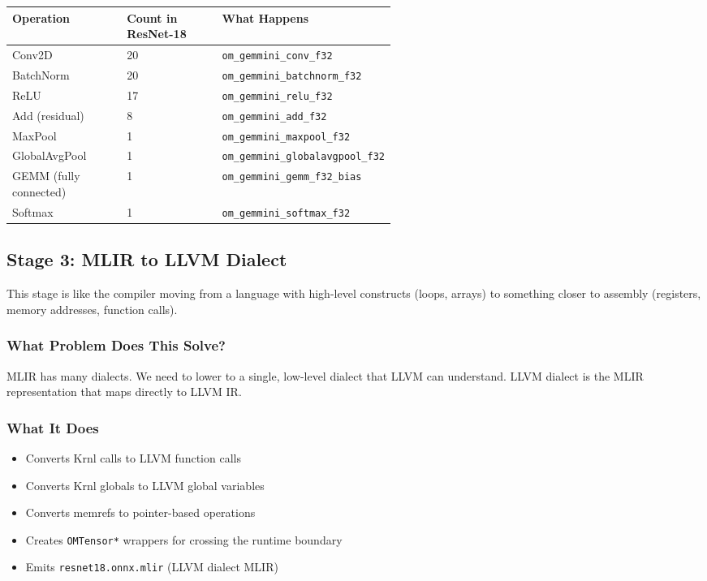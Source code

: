 \documentclass[12pt,a4paper]{article}
\begin{document}
\begin{table}[H]
\centering
\small
\begin{tabularx}{\linewidth}{@{}L{0.30\linewidth}L{0.25\linewidth}Y@{}}
\toprule
\textbf{Operation} & \textbf{Count in ResNet-18} & \textbf{What Happens} \\
\midrule
Conv2D & 20 & \texttt{om\_gemmini\_conv\_f32} \\
BatchNorm & 20 & \texttt{om\_gemmini\_batchnorm\_f32} \\
ReLU & 17 & \texttt{om\_gemmini\_relu\_f32} \\
Add (residual) & 8 & \texttt{om\_gemmini\_add\_f32} \\
MaxPool & 1 & \texttt{om\_gemmini\_maxpool\_f32} \\
GlobalAvgPool & 1 & \texttt{om\_gemmini\_globalavgpool\_f32} \\
GEMM (fully connected) & 1 & \texttt{om\_gemmini\_gemm\_f32\_bias} \\
Softmax & 1 & \texttt{om\_gemmini\_softmax\_f32} \\
\bottomrule
\end{tabularx}
\end{table}

\subsection{Stage 3: MLIR to LLVM Dialect}

\begin{analogyenv}
This stage is like the compiler moving from a language with high-level constructs (loops, arrays) to something closer to assembly (registers, memory addresses, function calls).
\end{analogyenv}

\subsubsection{What Problem Does This Solve?}
MLIR has many dialects. We need to lower to a single, low-level dialect that LLVM can understand. LLVM dialect is the MLIR representation that maps directly to LLVM IR.

\subsubsection{What It Does}
\begin{itemize}
  \item Converts Krnl calls to LLVM function calls
  \item Converts Krnl globals to LLVM global variables
  \item Converts memrefs to pointer-based operations
  \item Creates \texttt{OMTensor*} wrappers for crossing the runtime boundary
  \item Emits \texttt{resnet18.onnx.mlir} (LLVM dialect MLIR)
\end{itemize}
\end{document}
